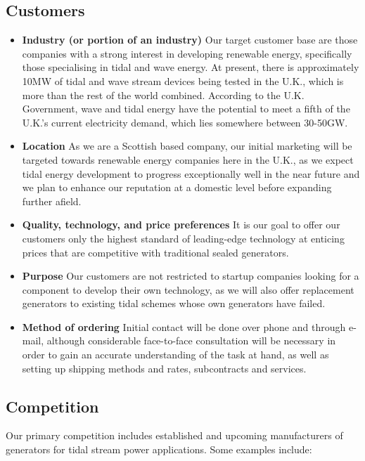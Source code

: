 \documentclass[a4paper,11pt]{article}
\begin{document}
\subsection{Customers}
\begin{itemize}
	\item \textbf{Industry (or portion of an industry)} Our target customer base are those companies with a strong interest in developing renewable energy, specifically those specialising in tidal and wave energy. At present, there is approximately 10MW of tidal and wave stream devices being tested in the U.K., which is more than the rest of the world combined\cite{f1}. According to the U.K. Government, wave and tidal energy have the potential to meet a fifth of the U.K.'s current electricity demand, which lies somewhere between 30-50GW\cite{f2}.
	
	\item \textbf{Location} As we are a Scottish based company, our initial marketing will be targeted towards renewable energy companies here in the U.K., as we expect tidal energy development to progress exceptionally well in the near future and we plan to enhance our reputation at a domestic level before expanding further afield.
	
	\item \textbf{Quality, technology, and price preferences} It is our goal to offer our customers only the highest standard of leading-edge technology at enticing prices that are competitive with traditional sealed generators.
	
	\item \textbf{Purpose} Our customers are not restricted to startup companies looking for a component to develop their own technology, as we will also offer replacement generators to existing tidal schemes whose own generators have failed.
	
	\item \textbf{Method of ordering} Initial contact will be done over phone and through e-mail, although considerable face-to-face consultation will be necessary in order to gain an accurate understanding of the task at hand, as well as setting up shipping methods and rates, subcontracts and services.
\end{itemize}

\subsection{Competition}
Our primary competition includes established and upcoming manufacturers of generators for tidal stream power applications. Some examples include:
\end{document}
